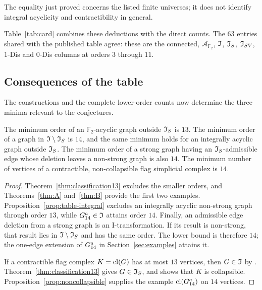 The equality just proved concerns the listed finite universes; it
does not identify integral acyclicity and contractibility in general.

Table~\ref{tab:card} combines these deductions with the direct counts.
The $63$ entries shared with the published table
\cite[Table~1]{DEFH2023} agree: these are the connected,
$\mathcal A_{\mathbb F_2}$, $\mathfrak I$, $\mathfrak I_S$, $\mathfrak I_{SV}$, $1$-Dis
and $0$-Dis columns at orders $3$ through $11$.

\begin{table}[tbp]
\centering
\caption{Numbers of isomorphism classes of connected graphs.
The two panels give twelve counts, with $n$ repeated.
The entire row $14^{\dagger}$ is restricted to $K_4$-free graphs.
$\mathcal A_R$ denotes reduced acyclicity over $R$, and $(-1)$-Dis
denotes the cones.}\label{tab:card}

\end{table}

\subsection{Consequences of the table}

The constructions and the complete lower-order counts now determine
the three minima relevant to the conjectures.

\begin{corollary}\label{cor:minimality}
The minimum order of an $\mathbb F_2$-acyclic graph outside $\mathfrak I_S$
is $13$. The minimum order of a graph in $\mathfrak I\setminus\mathfrak I_S$ is
$14$, and the same minimum holds for an integrally acyclic graph
outside $\mathfrak I_S$. The minimum order of a strong graph having an
$\mathfrak I_S$-admissible edge whose deletion leaves a non-strong graph
is also $14$. The minimum number of vertices of a contractible,
non-collapsible flag simplicial complex is $14$.
\end{corollary}
\begin{proof}
Theorem~\ref{thm:classification13} excludes the smaller orders,
and Theorems~\ref{thm:A} and~\ref{thm:B} provide the first two
examples. Proposition~\ref{prop:table-integral} excludes an
integrally acyclic non-strong graph through order $13$, while
$G_{14}^{a}\in\mathfrak I$ attains order $14$. Finally, an admissible edge
deletion from a strong graph is an I-transformation. If its result
is non-strong, that result lies in $\mathfrak I\setminus\mathfrak I_S$ and has the
same order. The lower bound is therefore $14$; the one-edge
extension of $G_{14}^{a}$ in Section~\ref{sec:examples} attains it.

If a contractible flag complex $K=\operatorname{cl}(G)$ has at most $13$ vertices,
then $G\in\mathfrak I$ by \cite[Corollary~1.5]{DochtermannMatsushita2025}.
Theorem~\ref{thm:classification13} gives $G\in\mathfrak I_S$, and
\cite[Theorem~1]{EFH2022} shows that $K$ is collapsible.
Proposition~\ref{prop:noncollapsible} supplies the example
$\operatorname{cl}(G_{14}^{a})$ on $14$ vertices.
\end{proof}

